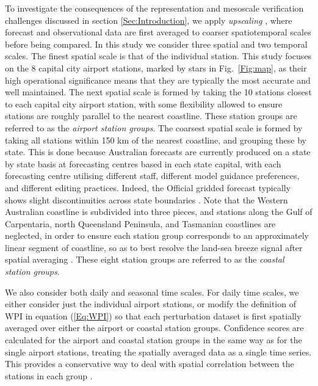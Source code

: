 \documentclass{ametsoc}
\begin{document}
To investigate the consequences of the representation and mesoscale verification challenges discussed in section \ref{Sec:Introduction}, we apply \textit{upscaling} \citep{ebert08}, where forecast and observational data are first averaged to coarser spatiotemporal scales before being compared. In this study we consider three spatial and two temporal scales. The finest spatial scale is that of the individual station. This study focuses on the 8 capital city airport stations, marked by stars in Fig.~\ref{Fig:map}, as their high operational significance means that they are typically the most accurate and well maintained. The next spatial scale is formed by taking the 10 stations closest to each capital city airport station, with some flexibility allowed to ensure stations are roughly parallel to the nearest coastline. These station groups are referred to as the \textit{airport station groups}. The coarsest spatial scale is formed by taking all stations within 150 km of the nearest coastline, and grouping these by state. This is done because Australian forecasts are currently produced on a state by state basis at forecasting centres based in each state capital, with each forecasting centre utilising different staff, different model guidance preferences, and different editing practices. Indeed, the Official gridded forecast typically shows slight discontinuities across state boundaries \citep{bomMetEye19}. Note that the Western Australian coastline is subdivided into three pieces, and stations along the Gulf of Carpentaria, north Queensland Peninsula, and Tasmanian coastlines are neglected, in order to ensure each station group corresponds to an approximately linear segment of coastline, so as to best resolve the land-sea breeze signal after spatial averaging \citep[e.g.][]{vincent16}. These eight station groups are referred to as the \textit{coastal station groups}.

We also consider both daily and seasonal time scales. For daily time scales, we either consider just the individual airport stations, or modify the definition of WPI in equation (\ref{Eq:WPI}) so that each perturbation dataset is first spatially averaged over either the airport or coastal station groups. Confidence scores are calculated for the airport and coastal station groups in the same way as for the single airport stations, treating the spatially averaged data as a single time series. This provides a conservative way to deal with spatial correlation between the stations in each group \citep{griffiths17}. 
\end{document}
